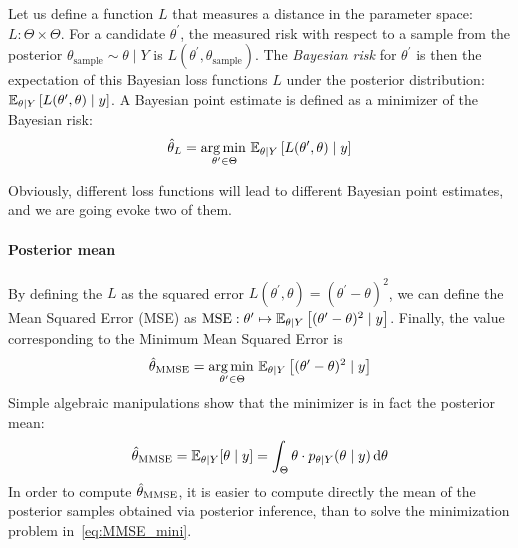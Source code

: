 \documentclass[../../Main_ManuscritThese.tex]{subfiles}
\begin{document}
Let us define a function $L$ that measures a distance in the parameter space: $L:\Theta\times \Theta$. For a candidate $\theta^{\prime}$, the measured risk with respect to a sample from the posterior $\theta_{\mathrm{sample}} \sim \theta \mid Y$ is $L(\theta^{\prime}, \theta_{\mathrm{sample}})$.
The \emph{Bayesian risk} for $\theta^{\prime}$ is then the expectation of this Bayesian loss functions $L$ under the posterior distribution: $\mathbb{E}_{\theta\mid Y}\left[L(\theta^{\prime},\theta)\mid y\right]$. A Bayesian point estimate is defined as a minimizer of the Bayesian risk:
\begin{equation}
  \hat{\theta}_{L} = \operatorname*{arg\,min \,}_{\theta^{\prime} \in \Theta} \mathbb{E}_{\theta\mid Y}\left[L(\theta^{\prime}, \theta) \mid y\right]
\end{equation}

Obviously, different loss functions will lead to different Bayesian point estimates, and we are going evoke two of them.
\paragraph{Posterior mean}
By defining the $L$ as the squared error $L(\theta^{\prime}, \theta) = (\theta^{\prime} - \theta)^2$, we can define the Mean Squared Error (MSE) as $\mathrm{MSE}: \theta^{\prime}\mapsto\mathbb{E}_{\theta\mid Y}\left[(\theta^{\prime} - \theta)^2 \mid y\right]$. Finally, the value corresponding to the Minimum Mean Squared Error is
\begin{equation}
  \label{eq:MMSE_mini}
  \hat{\theta}_{\mathrm{MMSE}} = \operatorname*{arg\,min \,}_{\theta^{\prime}\in\Theta}\mathbb{E}_{\theta\mid Y}\left[(\theta^{\prime} - \theta)^2 \mid  y\right]
\end{equation}
Simple algebraic manipulations show that the minimizer is in fact the posterior mean:
\begin{equation}
  \label{eq:def_MMSE}
  \hat{\theta}_{\mathrm{MMSE}} = \mathbb{E}_{\theta\mid Y}[\theta \mid  y] = \int_{\Theta}\theta\cdot p_{\theta\mid Y}(\theta \mid  y)\,\mathrm{d}\theta
\end{equation}
In order to compute $\hat{\theta}_{\mathrm{MMSE}}$, it is easier to compute directly the mean of the posterior samples obtained via posterior inference, than to solve the minimization problem in~\cref{eq:MMSE_mini}.
\end{document}
